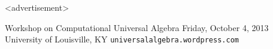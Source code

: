 \begin{frame}[fragile,label=plug]{{\footnotesize  <advertisement> }}
  \begin{center}
\alert{Workshop on Computational Universal Algebra}
\vskip3mm
Friday, October 4, 2013
\vskip3mm
University of Louisville, KY
\vskip3mm
\large{{\tt universalalgebra.wordpress.com}}
  \end{center}
\end{frame}
